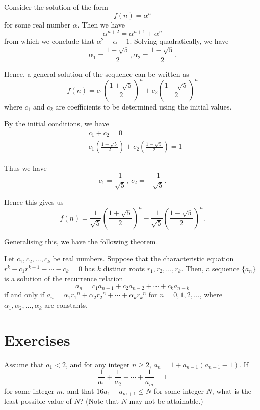 \begin{solution}
Consider the solution of the form \[ f(n)=\alpha^n \] for some real number $\alpha$. Then we have \[ \alpha^{n+2}=\alpha^{n+1}+\alpha^n \] from which we conclude that $\alpha^2 - \alpha - 1$. Solving quadratically, we have \[ \alpha_1=\frac{1+\sqrt{5}}{2}, \alpha_2=\frac{1-\sqrt{5}}{2}. \] 

Hence, a general solution of the sequence can be written as \[ f(n)=c_1 \left(\frac{1+\sqrt{5}}{2}\right)^n+c_2 \left(\frac{1-\sqrt{5}}{2}\right)^n \] where $c_1$ and $c_2$ are coefficients to be determined using the initial values.

By the initial conditions, we have 
\begin{align*}
& c_1+c_2=0 \\
& c_1 \left(\frac{1+\sqrt{5}}{2}\right)+c_2 \left(\frac{1-\sqrt{5}}{2}\right)=1
\end{align*}

Thus we have \[ c_1=\frac{1}{\sqrt{5}},\:c_2=- \frac{1}{\sqrt{5}}. \] 

Hence this gives us \[ \boxed{f(n)=\frac{1}{\sqrt{5}} \left(\frac{1+\sqrt{5}}{2}\right)^n - \frac{1}{\sqrt{5}} \left(\frac{1-\sqrt{5}}{2}\right)^n}. \]
\end{solution}

Generalising this, we have the following theorem.
\begin{theorem}
Let $c_1,c_2,\dots,c_k$ be real numbers. Suppose that the characteristic equation $r^k-c_1r^{k-1}-\cdots-c_k=0$ has $k$ distinct roots $r_1,r_2,\dots,r_k$. Then, a sequence $\{a_n\}$ is a solution of the recurrence relation 
\[ a_n=c_1a_{n-1}+c_2a_{n-2}+\cdots+c_ka_{n-k} \]
if and only if $a_n=\alpha_1{r_1}^n+\alpha_2{r_2}^n+\cdots+\alpha_k{r_k}^n$ for $n=0,1,2,\dots$, where $\alpha_1,\alpha_2,\dots,\alpha_k$ are constants.
\end{theorem}
\pagebreak

\section*{Exercises}
\begin{prbm}
Assume that $a_1<2$, and for any integer $n\ge2$, $a_n=1+a_{n-1}(a_{n-1}-1)$. If
\[\frac{1}{a_1}+\frac{1}{a_2}+\cdots+\frac{1}{a_m}=1\]
for some integer $m$, and that $16a_1-a_{m+1}\le N$ for some integer $N$, what is the least possible value of $N$? (Note that $N$ may not be attainable.)
\end{prbm}

